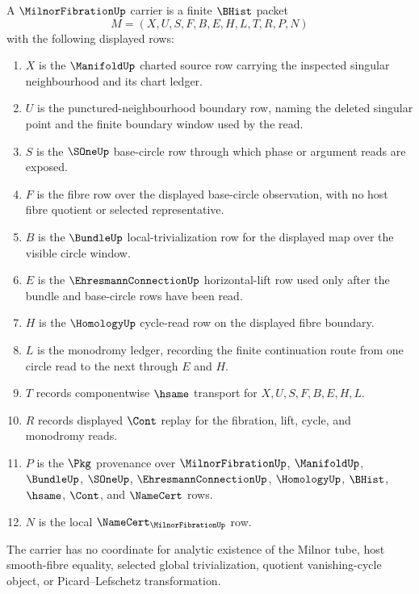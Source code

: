 \begin{definition}
\label{def:milnor-fibration-carrier}
A $\MilnorFibrationUp$ carrier is a finite $\BHist$ packet
$$
M=(X,U,S,F,B,E,H,L,T,R,P,N)
$$
with the following displayed rows:
\begin{enumerate}
\item $X$ is the $\ManifoldUp$ charted source row carrying the inspected singular neighbourhood and its chart ledger.
\item $U$ is the punctured-neighbourhood boundary row, naming the deleted singular point and the finite boundary window used by the read.
\item $S$ is the $\SOneUp$ base-circle row through which phase or argument reads are exposed.
\item $F$ is the fibre row over the displayed base-circle observation, with no host fibre quotient or selected representative.
\item $B$ is the $\BundleUp$ local-trivialization row for the displayed map over the visible circle window.
\item $E$ is the $\EhresmannConnectionUp$ horizontal-lift row used only after the bundle and base-circle rows have been read.
\item $H$ is the $\HomologyUp$ cycle-read row on the displayed fibre boundary.
\item $L$ is the monodromy ledger, recording the finite continuation route from one circle read to the next through $E$ and $H$.
\item $T$ records componentwise $\hsame$ transport for $X,U,S,F,B,E,H,L$.
\item $R$ records displayed $\Cont$ replay for the fibration, lift, cycle, and monodromy reads.
\item $P$ is the $\Pkg$ provenance over $\MilnorFibrationUp$, $\ManifoldUp$, $\BundleUp$, $\SOneUp$, $\EhresmannConnectionUp$, $\HomologyUp$, $\BHist$, $\hsame$, $\Cont$, and $\NameCert$ rows.
\item $N$ is the local $\NameCert_{\MilnorFibrationUp}$ row.
\end{enumerate}
The carrier has no coordinate for analytic existence of the Milnor tube, host smooth-fibre equality, selected global trivialization, quotient vanishing-cycle object, or Picard--Lefschetz transformation.
\end{definition}

